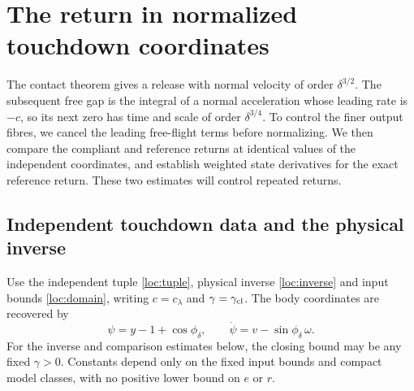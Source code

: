 \section{The return in normalized touchdown coordinates}
\label{sec:detuned-return}
The contact theorem gives a release with normal velocity of order
$\delta^{3/2}$. The subsequent free gap is the integral of a normal
acceleration whose leading rate is $-c$, so its next zero has time and
scale of order $\delta^{3/4}$. To control the finer output fibres, we
cancel the leading free-flight terms before normalizing. We then
compare the compliant and reference returns at identical values of the
independent coordinates, and establish weighted state derivatives for
the exact reference return. These two estimates will control repeated
returns.

\subsection{Independent touchdown data and the physical inverse}
\label{sec:touchdown-coordinates}

Use the independent tuple \eqref{loc:tuple}, physical inverse
\eqref{loc:inverse} and input bounds \eqref{loc:domain}, writing
$c=c_\lambda$ and $\gamma=\gamma_{\rm cl}$.
The body coordinates are recovered by
\[
 \psi=y-1+\cos\phi_\delta,\qquad
 \dot\psi=v-\sin\phi_\delta\,\omega.
\]
For the inverse and comparison estimates below, the closing bound may
be any fixed $\gamma>0$. Constants depend only on the fixed input
bounds and compact model classes, with no positive lower bound on
$e$ or $r$.

